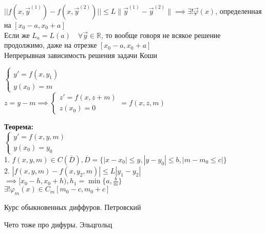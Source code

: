 \documentclass[12pt, a4paper]{article}
\begin{document}
$||f(x, \vec{y}^{(1)}) - f(x, \vec{y}^{(2)})|| \le L \| \vec{y}^{(1)} - \vec{y}^{(2)} \| \implies \exists! \vec{\varphi}(x)$, определенная на $[x_0 -a, x_0 + a]$\\

Если же $L_a = L(a) \quad \forall \vec{y} \in \mathbb{R}$, то вообще говоря не всякое решение продолжимо, даже на отрезке $[x_0-a, x_0+a]$ \\


Непрерывная зависимость решения задачи Коши

$
\begin{cases}
y' = f(x, y_1) \\
y(x_0) = m

\end{cases}
$\\
$ z = y - m \implies
\begin{cases}
z' = f(x, z+m) \\ z(x_0) = 0
\end{cases}
 = f(x,z,m)
$ 

\textbf{Теорема:}\\
$
\begin{cases}
y' = f(x, y, m)\\ y(x_0) = y_0
\end{cases}
$\\

1. $f(x,y,m) \in C(\overline{D}), \overline{D} = \{ |x-x_0| \le y, |y-y_0| \le b, |m - m_0 \le c| \} $\\
2. $|f(x,y,m) - f(x,y_2,m)| \le L|y_1 - y_2|$\\
$\implies [x_0 - h, x_0 + h), h_1 = \min\{a, \frac{b}{m}\}$\\
$\exists!\varphi_m(x) \in C_m[m_0-c, m_0+c]$\\

\begin{list}{•}{Литература:}
\item Курс обыкновенных диффуров. Петровский
\item Чето тоже про дифуры. Эльцгольц
\end{list}
 
 
\end{document}
